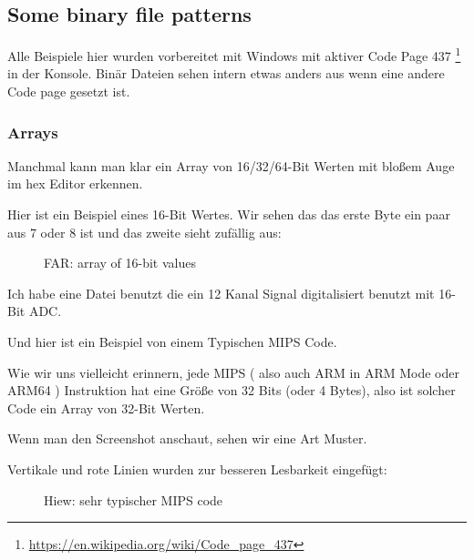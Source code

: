 
\subsection{Some binary file patterns} %

Alle Beispiele hier wurden vorbereitet mit Windows mit aktiver Code Page 437
\footnote{\url{https://en.wikipedia.org/wiki/Code_page_437}} in der Konsole.
Binär Dateien sehen intern etwas anders aus wenn eine andere Code page gesetzt ist.

\clearpage
\subsubsection{Arrays}

Manchmal kann man klar ein Array von 16/32/64-Bit Werten mit bloßem Auge im hex Editor erkennen.

Hier ist ein Beispiel eines 16-Bit Wertes.
Wir sehen das das erste Byte ein paar aus 7 oder 8 ist und das zweite sieht
zufällig aus:

\begin{figure}[H]
\centering
{}
\caption{FAR: array of 16-bit values} %
\end{figure}

Ich habe eine Datei benutzt die ein 12 Kanal Signal digitalisiert benutzt mit 16-Bit \ac{ADC}. %

\clearpage
{}
\par Und hier ist ein Beispiel von einem Typischen MIPS Code.

Wie wir uns vielleicht erinnern, jede MIPS ( also auch ARM in ARM Mode oder ARM64 ) Instruktion hat eine Größe von 32 Bits (oder 4 Bytes),
also ist solcher Code ein Array von 32-Bit Werten. 

Wenn man den Screenshot anschaut, sehen wir eine Art Muster.

Vertikale und rote Linien wurden zur besseren Lesbarkeit eingefügt:

\begin{figure}[H]
\centering
{}
\caption{Hiew: sehr typischer MIPS code}
\end{figure}

